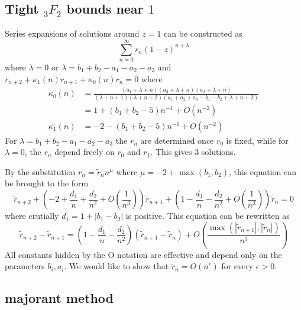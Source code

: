 \documentclass[10pt]{article}
\begin{document}
\subsection{Tight ${}_3 F_2$ bounds near $1$}

Series expansions of solutions around $z=1$ can be constructed as
\begin{equation*}
\sum_{n=0}^{\infty} r_n (1-z)^{n+\lambda}
\end{equation*}
where $\lambda =0$ or $\lambda = b_1+b_2-a_1-a_2-a_3$ and $r_{n+2} + \kappa_1(n) r_{n+1} + \kappa_0(n) r_n = 0$ where
\begin{align*}
\kappa_0(n) &= \frac{\left(a_1+\lambda +n\right) \left(a_2+\lambda
   +n\right) \left(a_3+\lambda +n\right)}{(\lambda +n+1)
   (\lambda +n+2) \left(a_1+a_2+a_3-b_1-b_2+\lambda
   +n+2\right)}\\
&=1 + \left(b_1+b_2-5 \right) n^{-1} + O(n^{-2})\\
\kappa_1(n) &=-2 - \left(b_1+b_2-5 \right) n^{-1} + O(n^{-2})
\end{align*}
For $\lambda = b_1+b_2-a_1-a_2-a_3$ the $r_n$ are determined once $r_0$ is fixed, while for $\lambda = 0$, the $r_n$ depend freely on $r_0$ and $r_1$. This gives $3$ solutions.

By the substitution $r_n = \tilde{r}_n n^\mu$ where $\mu = -2 + \operatorname{max}(b_1,b_2)$, this equation can be brought to the form
\begin{equation*}
\tilde{r}_{n+2} + \left(-2 + \frac{d_1}{n} + \frac{d_2}{n^2} + O(\frac{1}{n^3}) \right) \tilde{r}_{n+1} + \left(1 - \frac{d_1}{n} - \frac{d_2}{n^2} + O(\frac{1}{n^3}) \right) \tilde{r}_{n} = 0
\end{equation*}
where crutially $d_1 = 1 + |b_1-b_2|$ is positive. This equation can be rewritten as
\begin{equation*}
\tilde{r}_{n+2} - \tilde{r}_{n+1} = \left(1 - \frac{d_1}{n} - \frac{d_2}{n^2} \right) (\tilde{r}_{n+1} - \tilde{r}_{n}) + O(\frac{\operatorname{max}(|\tilde{r}_{n+1}|, |\tilde{r}_{n}|)}{n^3})
\end{equation*}
All constants hidden by the O notation are effective and depend only on the parameters $b_i,a_i$. We would like to show that $\tilde{r}_{n} = O(n^{\epsilon})$ for every $\epsilon > 0$.


\subsection{majorant method}
\end{document}
